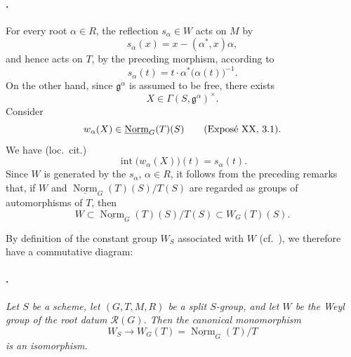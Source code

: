 \paragraph{.}
For every root \(\alpha\in R\), the reflection \(s_\alpha\in W\)
acts on \(M\) by
\[
  s_\alpha(x)=x-(\alpha^*,x)\alpha,
\]
and hence acts on \(T\), by the preceding morphism, according to
\[
  s_\alpha(t)=t\cdot\alpha^*\bigl(\alpha(t)\bigr)^{-1}.
\]
On the other hand, since \(\mathfrak g^\alpha\) is assumed to be
free, there exists
\[
  X\in\Gamma(S,\mathfrak g^\alpha)^\times.
\]
Consider
\[
  w_\alpha(X)\in
  \underline{\operatorname{Norm}}_G(T)(S)
  \qquad\textup{(Exposé XX, 3.1)}.
\]
We have \textup{(loc.\ cit.)}
\[
  \operatorname{int}\bigl(w_\alpha(X)\bigr)(t)=s_\alpha(t).
\]
Since \(W\) is generated by the \(s_\alpha\), \(\alpha\in R\), it
follows from the preceding remarks that, if \(W\) and
\(\underline{\operatorname{Norm}}_G(T)(S)/T(S)\) are regarded as
groups of automorphisms of \(T\), then
\[
  W
  \subset
  \underline{\operatorname{Norm}}_G(T)(S)/T(S)
  \subset
  W_G(T)(S).
\]

By definition of the constant group \(W_S\) associated with \(W\)
\textup{(cf.\ )}, we therefore have a commutative
diagram:

\begin{center}


\end{center}

\paragraph{.}
\textit{Let \(S\) be a scheme, let \((G,T,M,R)\) be a split
\(S\)-group, and let \(W\) be the Weyl group of the root datum
\(\mathcal R(G)\). Then the canonical monomorphism}
\[
  W_S\longrightarrow
  W_G(T)=\underline{\operatorname{Norm}}_G(T)/T
\]
\textit{is an isomorphism.}

